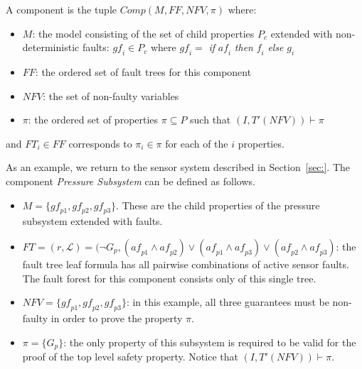 \begin{definition}
A component is the tuple $\mathit{Comp}(M, \mathit{FF}, \mathit{NFV}, \pi)$ where:
\begin{itemize}[label=\textbullet]
\item $M$: the model consisting of the set of child properties $P_c$ extended with non-deterministic faults: $\mathit{gf}_i \in P_c$ where $\mathit{gf}_i =$ \textit{if} $\mathit{af}_i$ \textit{then} $\mathit{f}_i$ \textit{else} $g_i$
\item $\mathit{FF}$: the ordered set of fault trees for this component
\item $\mathit{NFV}$: the set of non-faulty variables 
\item $\pi$: the ordered set of properties $\pi \subseteq P$ such that $(I, T'(\mathit{NFV})) \vdash \pi$
\end{itemize}
and $\mathit{FT}_i \in \mathit{FF}$ corresponds to $\pi_i \in \pi$ for each of the $i$ properties.  
\end{definition}


As an example, we return to the sensor system described in Section~\ref{sec:}. The component {\em Pressure Subsystem} can be defined as follows. 

\begin{itemize}[label=\textbullet]
\item $M = \{\mathit{gf}_{p1}, \mathit{gf}_{p2}, \mathit{gf}_{p3}\}$. These are the child properties of the pressure subsystem extended with faults. 
\item $\mathit{FT} = (r, \mathcal{L}) = (\neg G_p, (\mathit{af}_{p1} \land \mathit{af}_{p2}) \lor (\mathit{af}_{p1} \land \mathit{af}_{p3}) \lor (\mathit{af}_{p2} \land \mathit{af}_{p3}) $: the fault tree leaf formula has all pairwise combinations of active sensor faults. The fault forest for this component consists only of this single tree.
\item $\mathit{NFV} = \{\mathit{gf}_{p1}, \mathit{gf}_{p2}, \mathit{gf}_{p3}\}$: in this example, all three guarantees must be non-faulty in order to prove the property $\pi$.
\item $\pi = \{G_p\}$: the only property of this subsystem is required to be valid for the proof of the top level safety property. Notice that $(I, T'(\mathit{NFV})) \vdash \pi$.
\end{itemize}


